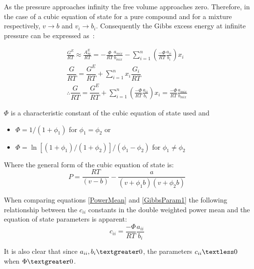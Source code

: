 As the pressure approaches infinity the free volume approaches zero. Therefore, in the case of a cubic equation of state for a pure compound and for a mixture respectively, $ v \rightarrow b$ and $v_{i} \rightarrow b_{i}$. Consequently the Gibbs excess energy at infinite pressure can be expressed as~\cite{HuronVidal, Vidal}:\

\begin{eqnarray}
  \frac{G^{E}}{RT} \approx \frac{A^{E}_{\infty}}{RT} = -\frac{\Phi}{RT} \frac{a_{mix}}{b_{mix}} -\sum_{i = 1}^{n}\left(\frac{-\Phi}{RT} \frac{a_{ii}}{b_{i}}\right)x_{i} \\
  \dfrac{G}{RT} = \dfrac{G^{E}}{RT} + \sum_{i=1}^{n}x_{i}\dfrac{G_{i}}{RT}\\
   \therefore \dfrac{G}{RT} = \dfrac{G^{E}}{RT} +\sum_{i=1}^{n}\left(\frac{-\Phi}{RT} \frac{a_{ii}}{b_{i}}\right)x_{i} = \frac{-\Phi}{RT} \frac{a_{mix}}{b_{mix}} \label{GibbsParam1}
\end{eqnarray}


$\Phi$ is a characteristic constant of the cubic equation of state used and\\

\begin{itemize}
\item $\Phi = 1/\left(1+\phi_{1}\right)$ for $\phi_{1} = \phi_{2}$ or
\item $\Phi = \ln \left[\left(1+\phi_{1}\right)/\left(1+\phi_{2}\right)\right]/\left(\phi_{1} - \phi_{2}\right)$ for  $\phi_{1} \neq \phi_{2}$
\end{itemize}

Where the general form of the cubic equation of state is:
\begin{equation}
  P = \frac{RT}{\left(v-b\right)} - \frac{a}{\left(v+\phi_{1}b\right)\left(v+\phi_{2}b\right)}
\end{equation}

When comparing equations \ref{PowerMean} and \ref{GibbsParam1} the following relationship between the $c_{ii}$ constants in the double weighted power mean and the equation of state parameters is apparent:
\begin{equation}
  c_{ii} = \frac{-\Phi}{RT} \frac{a_{ii}}{b_{i}} \label{DWPMParam}
\end{equation}

It is also clear that since $a_{ii}, b_{i} \textgreater 0$, the parameters $c_{ii}\textless 0$ when $\Phi\textgreater 0$.\\

